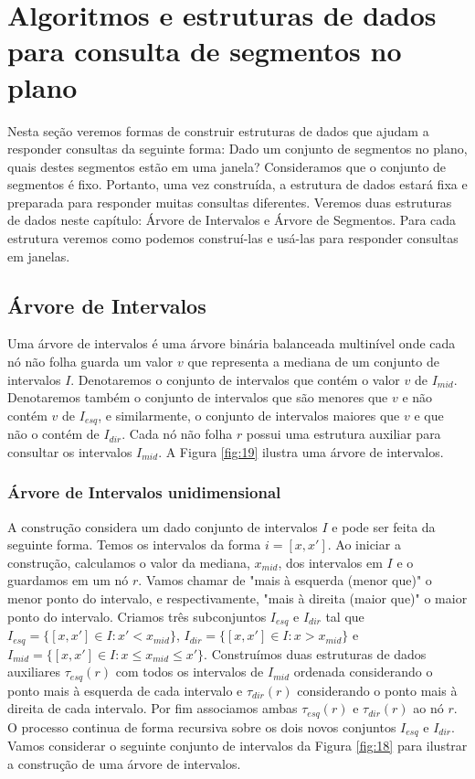 \chapter{Algoritmos e estruturas de dados para consulta de segmentos no plano}
Nesta seção veremos formas de construir estruturas de dados que ajudam a responder consultas da seguinte forma: Dado um conjunto de segmentos no plano, quais destes segmentos estão em uma janela? Consideramos que o conjunto de segmentos é fixo. Portanto, uma vez construída, a estrutura de dados estará fixa e preparada para responder muitas consultas diferentes. Veremos duas estruturas de dados neste capítulo: Árvore de Intervalos e Árvore de Segmentos. Para cada estrutura veremos como podemos construí-las e usá-las para responder consultas em janelas.%

\section{Árvore de Intervalos} \label{interval-tree}
Uma árvore de intervalos é uma árvore binária balanceada multinível onde cada nó não folha guarda um valor $v$ que representa a mediana de um conjunto de intervalos $I$. Denotaremos o conjunto de intervalos que contém o valor $v$ de $I_{mid}$. Denotaremos também o conjunto de intervalos que são menores que $v$ e não contém $v$ de $I_{esq}$, e similarmente, o conjunto de intervalos maiores que $v$ e que não o contém de $I_{dir}$. Cada nó não folha $r$ possui uma estrutura auxiliar para consultar os intervalos $I_{mid}$. A Figura \ref{fig:19} ilustra uma árvore de intervalos.
 
\subsection{Árvore de Intervalos unidimensional}
A construção considera um dado conjunto de intervalos $I$ e pode ser feita da seguinte forma. Temos os intervalos da forma $i = [x,x']$. Ao iniciar a construção, calculamos o valor da mediana, $x_{mid}$, dos intervalos em $I$ e o guardamos em um nó $r$. Vamos chamar de "mais à esquerda (menor que)" o menor ponto do intervalo, e respectivamente, "mais à direita (maior que)" o maior ponto do intervalo. Criamos três subconjuntos $I_{esq}$ e $I_{dir}$ tal que $I_{esq} = \{[x, x'] \in I : x' < x_{mid} \}$, $I_{dir} = \{[x, x'] \in I : x > x_{mid} \}$ e $I_{mid} = \{[x, x'] \in I : x \leq x_{mid} \leq x' \}$. Construímos duas estruturas de dados auxiliares $\tau_{esq}(r)$ com todos os intervalos de $I_{mid}$ ordenada considerando o ponto mais à esquerda de cada intervalo e $\tau_{dir}(r)$ considerando o ponto mais à direita de cada intervalo. Por fim associamos ambas  $\tau_{esq}(r)$  e  $\tau_{dir}(r)$ ao nó $r$. O processo continua de forma recursiva sobre os dois novos conjuntos $I_{esq}$ e $I_{dir}$. Vamos considerar o seguinte conjunto de intervalos da Figura \ref{fig:18} para ilustrar a construção de uma árvore de intervalos.

